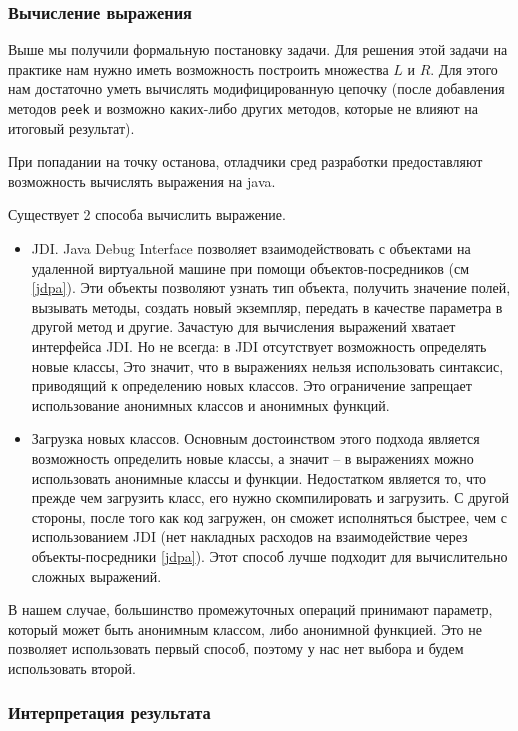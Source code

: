 \subsubsection{Вычисление выражения} \label{code-evaluation}
Выше мы получили формальную постановку задачи. Для решения этой задачи на практике нам нужно иметь возможность построить множества $L$ и $R$. Для этого нам достаточно уметь вычислять модифицированную цепочку (после добавления методов \texttt{peek} и возможно каких-либо других методов, которые не влияют на итоговый результат).

При попадании на точку останова, отладчики сред разработки предоставляют возможность вычислять выражения на java.

Существует 2 способа вычислить выражение. 
\begin{itemize}
	\item JDI. Java Debug Interface позволяет взаимодействовать с объектами на удаленной виртуальной машине при помощи объектов-посредников (см \ref{jdpa}). Эти объекты позволяют узнать тип объекта, получить значение полей, вызывать методы, создать новый экземпляр, передать в качестве параметра в другой метод и другие. Зачастую для вычисления выражений хватает интерфейса JDI. Но не всегда: в JDI отсутствует возможность определять новые классы, Это значит, что в выражениях нельзя использовать синтаксис, приводящий к определению новых классов. Это ограничение запрещает использование анонимных классов и анонимных функций.
	\item Загрузка новых классов. Основным достоинством этого подхода является возможность определить новые классы, а значит -- в выражениях можно использовать анонимные классы и функции. Недостатком является то, что прежде чем загрузить класс, его нужно скомпилировать и загрузить. С другой стороны, после того как код загружен, он сможет исполняться быстрее, чем с использованием JDI (нет накладных расходов на взаимодействие через объекты-посредники \ref{jdpa}). Этот способ лучше подходит для вычислительно сложных выражений.
\end{itemize}

В нашем случае, большинство промежуточных операций принимают параметр, который может быть анонимным классом, либо анонимной функцией. Это не позволяет использовать первый способ, поэтому у нас нет выбора и будем использовать второй.

\subsubsection{Интерпретация результата}\label{interpret}

